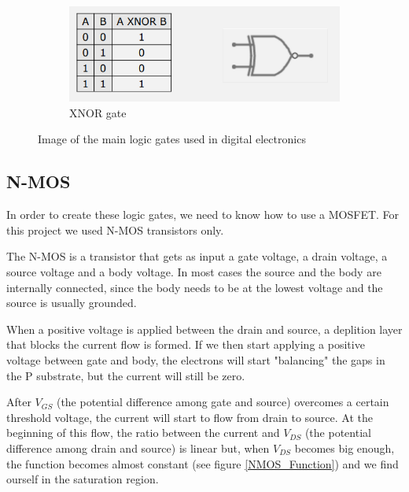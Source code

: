 \documentclass{article}
\begin{document}
\begin{figure}[h!]
    \centering
    \begin{subfigure}{.4\textwidth}
        \centering
        \includegraphics[width=\linewidth]{IM_XNOR.PNG}
        \caption{XNOR gate}
        \label{XNOR}
    \end{subfigure}

\caption{Image of the main logic gates used in digital electronics}
\label{LogicGates}
\end{figure}




\clearpage

\subsection{N-MOS}

In order to create these logic gates, we need to know how to use a MOSFET. For this project we used N-MOS transistors only.

\vspace{3mm}

The N-MOS is a transistor that gets as input a gate voltage, a drain voltage, a source voltage and a body voltage. In most cases the source and the body are internally connected, since the body needs to be at the lowest voltage and the source is usually grounded.

\vspace{3mm}

When a positive voltage is applied between the drain and source, a deplition layer that blocks the current flow is formed. 
If we then start applying a positive voltage between gate and body, the electrons will start "balancing" the gaps in the P substrate, but the current will still be zero.

\vspace{3mm}

After $V_{GS}$ (the potential difference among gate and source) overcomes a certain threshold voltage, the current will start to flow from drain to source. At the beginning of this flow, the ratio between the current and $V_{DS}$ (the potential difference among drain and source) is linear but, when $V_{DS}$ becomes big enough, the function becomes almost constant (see figure \ref{NMOS_Function}) and we find ourself in the saturation region.
\end{document}
